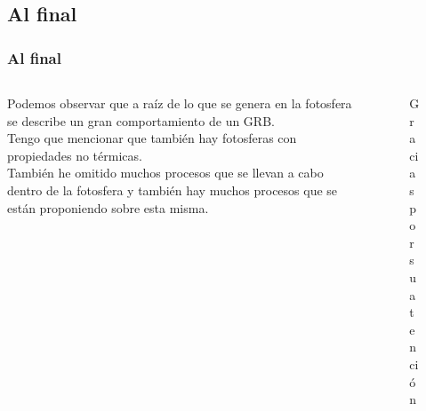 \documentclass{beamer}
\begin{document}
\begin{frame}
\section{Al final}
\frametitle{Al final}
	\begin{columns}
		\begin{column}{5cm}
		Podemos observar que a ra\'iz de lo que
		se genera en la fotosfera se describe un
		gran comportamiento de un GRB.\\
		
		Tengo que mencionar que tambi\'en hay 
		fotosferas con propiedades no t\'ermicas.\\
		
		Tambi\'en he omitido muchos procesos que
		se llevan a cabo dentro de la fotosfera y tambi\'en hay muchos procesos que se est\'an proponiendo sobre esta misma.
		\end{column}
		
		\begin{column}{5cm}
			\begin{figure}
				Gracias por su atenci\'on
			\end{figure}
		\end{column}	
	\end{columns}
\end{frame}
\end{document}
